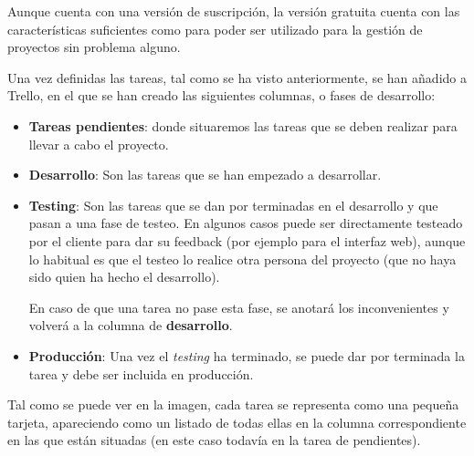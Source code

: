 \documentclass{\ClassPath/viu-tfm-template}
\begin{document}
Aunque cuenta con una versión de suscripción, la versión gratuita cuenta con las características suficientes como para poder ser utilizado para la gestión de proyectos sin problema alguno.

Una vez definidas las tareas, tal como se ha visto anteriormente, se han añadido a Trello, en el que se han creado las siguientes columnas, o fases de desarrollo:

\begin{itemize}
    \item \textbf{Tareas pendientes}: donde situaremos las tareas que se deben realizar para llevar a cabo el proyecto.

\end{itemize}

\begin{minipage}{0.6\linewidth}
    \begin{itemize}
        \item \textbf{Desarrollo}: Son las tareas que se han empezado a desarrollar.
        \item \textbf{Testing}: Son las tareas que se dan por terminadas en el desarrollo y que pasan a una fase de testeo. En algunos casos puede ser directamente testeado por el cliente para dar su feedback (por ejemplo para el interfaz web), aunque lo habitual es que el testeo lo realice otra persona del proyecto (que no haya sido quien ha hecho el desarrollo).

        En caso de que una tarea no pase esta fase, se anotará los inconvenientes y volverá a la columna de \textbf{desarrollo}.
        \item \textbf{Producción}: Una vez el \textit{testing} ha terminado, se puede dar por terminada la tarea y debe ser incluida en producción.
    \end{itemize}

Tal como se puede ver en la imagen, cada tarea se representa como una pequeña tarjeta, apareciendo como un listado de todas ellas en la columna correspondiente en las que están situadas (en este caso todavía en la tarea de pendientes).
\end{minipage}
\hfill
\end{document}
